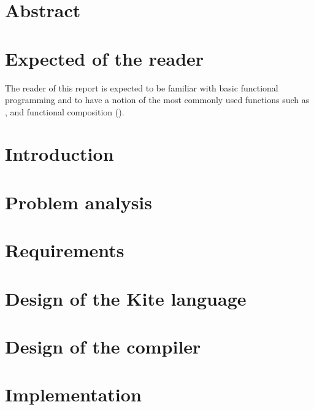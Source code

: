 \documentclass{article}
\begin{document}

\clearpage

\section*{Abstract}


\section*{Expected of the reader}

The reader of this report is expected to be familiar with basic functional programming and to have a notion of the most commonly used functions such as ,  and functional composition ().

\clearpage

\tableofcontents
\clearpage

\section{Introduction}

\clearpage

\section{Problem analysis}
\label{sec:probanal}

\clearpage

\section{Requirements}
\label{sec:requirements}

\clearpage

\section{Design of the Kite language}
\label{sec:kite-design}

\clearpage

\section{Design of the compiler}
\label{sec:compiler-design}

\clearpage

\section{Implementation}
\label{sec:impl}

\clearpage
\end{document}
